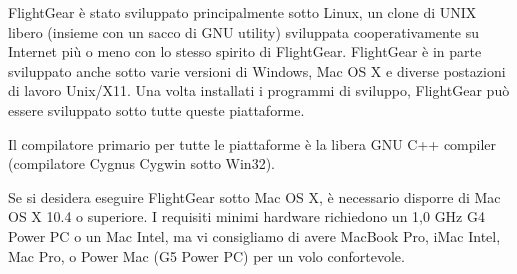 {FlightGear \`{e} stato sviluppato principalmente sotto Linux, un clone di UNIX libero (insieme
con un sacco di GNU utility) sviluppata cooperativamente su Internet pi\`{u} o meno con lo stesso
spirito di FlightGear. FlightGear \`{e} in parte sviluppato anche sotto varie versioni di Windows,
Mac OS X e diverse postazioni di lavoro Unix/X11. Una volta installati i programmi di sviluppo,
FlightGear pu\`{o} essere sviluppato sotto tutte queste piattaforme.

Il compilatore primario per tutte le piattaforme \`{e} la libera GNU C++ compiler (compilatore
Cygnus Cygwin sotto Win32).

Se si desidera eseguire FlightGear sotto Mac OS X, \`{e} necessario disporre di Mac OS X 10.4 o
superiore. I requisiti minimi hardware richiedono un 1,0 GHz G4 Power PC o un Mac Intel, ma vi
consigliamo di avere MacBook Pro, iMac Intel, Mac Pro, o Power Mac (G5 Power PC) per un volo
confortevole.
}{}




